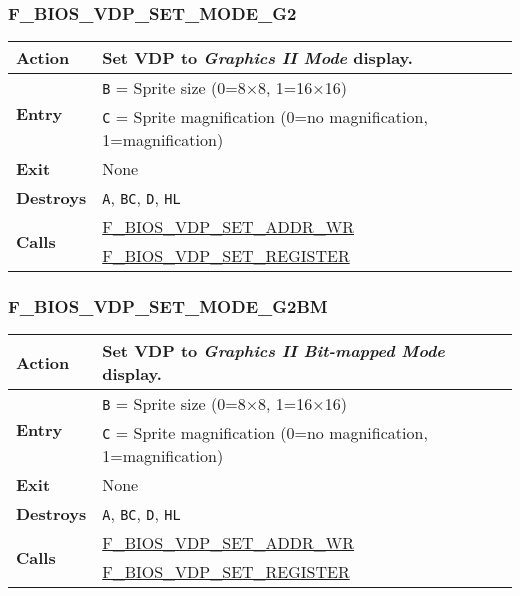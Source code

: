         \subsubsection{F\_BIOS\_VDP\_SET\_MODE\_G2}
        \label{func:fbiosvdpsetmodeg2}
        \begin{tabular}{l p{9cm}}
            \hline\textbf{Action}
            & Set \textbf{VDP} to \textit{Graphics II Mode} display.\\
            \hline\multirow[t]{2}{4em}{\textbf{Entry}}
            & \texttt{B} = Sprite size (0=8×8, 1=16×16)\\
            & \texttt{C} = Sprite magnification (0=no magnification,
                1=magnification)\\
            \hline\textbf{Exit} & None\\
            \hline\textbf{Destroys} & \texttt{A}, \texttt{BC}, \texttt{D},
            \texttt{HL} \\
            \hline\multirow[t]{2}{4em}{\textbf{Calls}}
            & \hyperref[func:fbiosvdpsetaddrwr]{F\_BIOS\_VDP\_SET\_ADDR\_WR}\\
            & \hyperref[func:fbiosvdpsetregister]{F\_BIOS\_VDP\_SET\_REGISTER}\\
            \hline
        \end{tabular}

        \subsubsection{F\_BIOS\_VDP\_SET\_MODE\_G2BM}
        \label{func:fbiosvdpsetmodeg2bm}
        \begin{tabular}{l p{9cm}}
            \hline\textbf{Action}
            & Set \textbf{VDP} to \textit{Graphics II Bit-mapped Mode} display.\\
            \hline\multirow[t]{2}{4em}{\textbf{Entry}}
            & \texttt{B} = Sprite size (0=8×8, 1=16×16)\\
            & \texttt{C} = Sprite magnification (0=no magnification,
                1=magnification)\\
            \hline\textbf{Exit} & None\\
            \hline\textbf{Destroys} & \texttt{A}, \texttt{BC}, \texttt{D},
            \texttt{HL} \\
            \hline\multirow[t]{2}{4em}{\textbf{Calls}}
            & \hyperref[func:fbiosvdpsetaddrwr]{F\_BIOS\_VDP\_SET\_ADDR\_WR}\\
            & \hyperref[func:fbiosvdpsetregister]{F\_BIOS\_VDP\_SET\_REGISTER}\\
            \hline
        \end{tabular}

